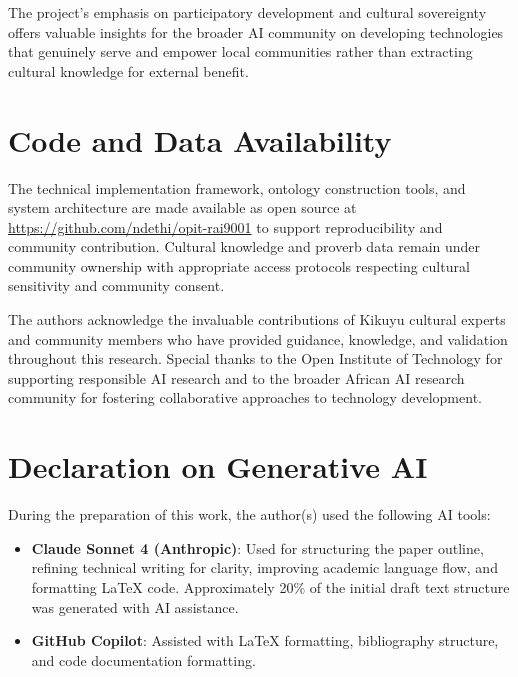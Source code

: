 \documentclass[
]{ceurart}
\begin{document}
The project's emphasis on participatory development and cultural sovereignty offers valuable insights for the broader AI community on developing technologies that genuinely serve and empower local communities rather than extracting cultural knowledge for external benefit.

\section{Code and Data Availability}

The technical implementation framework, ontology construction tools, and system architecture are made available as open source at \url{https://github.com/ndethi/opit-rai9001} to support reproducibility and community contribution. Cultural knowledge and proverb data remain under community ownership with appropriate access protocols respecting cultural sensitivity and community consent.

\begin{acknowledgments}
  The authors acknowledge the invaluable contributions of Kikuyu cultural experts and community members who have provided guidance, knowledge, and validation throughout this research. Special thanks to the Open Institute of Technology for supporting responsible AI research and to the broader African AI research community for fostering collaborative approaches to technology development.
\end{acknowledgments}

\section*{Declaration on Generative AI}
During the preparation of this work, the author(s) used the following AI tools:
\begin{itemize}
    \item \textbf{Claude Sonnet 4 (Anthropic)}: Used for structuring the paper outline, refining technical writing for clarity, improving academic language flow, and formatting LaTeX code. Approximately 20\% of the initial draft text structure was generated with AI assistance.
    \item \textbf{GitHub Copilot}: Assisted with LaTeX formatting, bibliography structure, and code documentation formatting.
\end{itemize}
\end{document}
